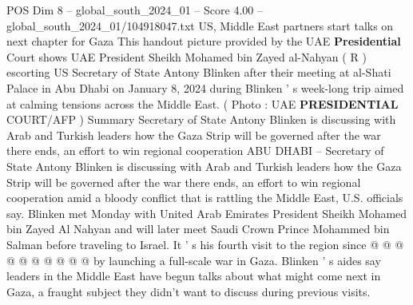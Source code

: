 \begin{textsample}{POS Dim 8 – global\_south\_2024\_01 – Score 4.00 – global\_south\_2024\_01/104918047.txt}  \label{ex:f8_pos_286}
US, Middle East partners start talks on next chapter for Gaza This handout picture provided by the UAE \textbf{Presidential} Court shows UAE President Sheikh Mohamed bin Zayed al-Nahyan ( R ) escorting US Secretary of State Antony Blinken after their meeting at al-Shati Palace in Abu Dhabi on January 8, 2024 during Blinken ' s week-long trip aimed at calming tensions across the Middle East. ( Photo : UAE \textbf{PRESIDENTIAL} COURT/AFP ) Summary Secretary of State Antony Blinken is discussing with Arab and Turkish leaders how the Gaza Strip will be governed after the war there ends, an effort to win regional cooperation ABU DHABI -- Secretary of State Antony Blinken is discussing with Arab and Turkish leaders how the Gaza Strip will be governed after the war there ends, an effort to win regional cooperation amid a bloody conflict that is rattling the Middle East, U.S. officials say.
Blinken met Monday with United Arab Emirates President Sheikh Mohamed bin Zayed Al Nahyan and will later meet Saudi Crown Prince Mohammed bin Salman before traveling to Israel.
It ' s his fourth visit to the region since @ @ @ @ @ @ @ @ @ @ by launching a full-scale war in Gaza.
Blinken ' s aides say leaders in the Middle East have begun talks about what might come next in Gaza, a fraught subject they didn't want to discuss during previous visits.

\end{textsample}
